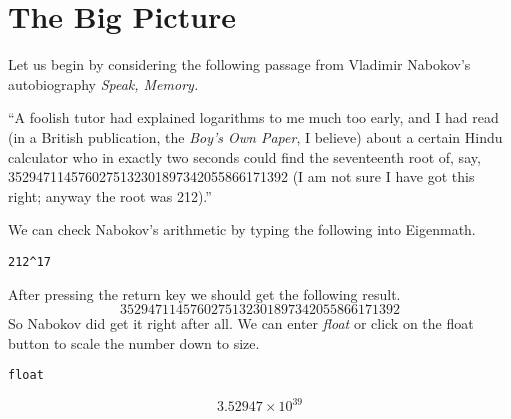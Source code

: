 \chapter{The Big Picture}
Let us begin by considering the following passage from Vladimir Nabokov's
autobiography {\it Speak, Memory.}

\medskip
\noindent
``A foolish tutor had explained logarithms to me much too early, and I had
read (in a British publication, the {\it Boy's Own Paper}, I believe)
about a certain Hindu calculator who in exactly two seconds could find the
seventeenth root of, say,
3529471145760275132301897342055866171392
(I am not sure I have got this right; anyway the root was 212).''

\medskip
\noindent
We can check Nabokov's arithmetic by typing the following into Eigenmath.

\medskip
\verb$212^17$

\medskip
\noindent
After pressing the return key we should get the following result.
$$3529471145760275132301897342055866171392$$
So Nabokov did get it right after all.
We can enter {\it float} or click on the float button to scale the number
down to size.

\medskip
\verb$float$

$$3.52947\times10^{39}$$

